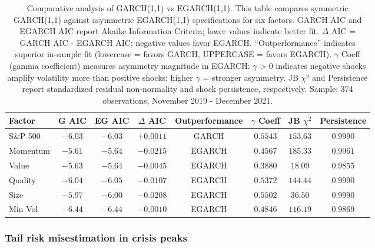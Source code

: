 \documentclass{article}
\begin{document}
\begin{table}[htbp]
\centering
\caption{Comparative analysis of GARCH(1,1) vs EGARCH(1,1). This table compares symmetric GARCH(1,1) against asymmetric EGARCH(1,1) specifications for six factors. GARCH AIC and EGARCH AIC report Akaike Information Criteria; lower values indicate better fit. $\Delta$ AIC = GARCH AIC - EGARCH AIC; negative values favor EGARCH. “Outperformance” indicates superior in-sample fit (lowercase = favors GARCH, UPPERCASE = favors EGARCH). $\gamma$ Coeff (gamma coefficient) measures asymmetry magnitude in EGARCH: $\gamma$ > 0 indicates negative shocks amplify volatility more than positive shocks; higher $\gamma$ = stronger asymmetry. JB $\chi$² and Persistence report standardized residual non-normality and shock persistence, respectively. Sample: 374 observations, November 2019 - December 2021.}
\label{tab:model_comparison}
\begin{tabular}{lccccccc}
\toprule
\textbf{Factor} & \textbf{G AIC} & \textbf{EG AIC} & \textbf{$\Delta$ AIC} & \textbf{Outperformance} & \textbf{$\gamma$ Coeff} & \textbf{JB $\chi^2$} & \textbf{Persistence} \\
\midrule
S\&P 500   & $-6.03$  & $-6.03$  & $+0.0011$  & GARCH  & $0.5543$ & $153.63$ & $0.9990$ \\
Momentum   & $-5.61$  & $-5.64$  & $-0.0215$  & EGARCH & $0.4567$ & $185.33$ & $0.9961$ \\
Value      & $-5.63$  & $-5.64$  & $-0.0045$  & EGARCH & $0.3880$ & $18.09$  & $0.9855$ \\
Quality    & $-6.04$  & $-6.05$  & $-0.0107$  & EGARCH & $\mathbf{0.5372}$ & $144.44$ & $0.9990$ \\
Size       & $-5.97$  & $-6.00$  & $-0.0208$  & EGARCH & $0.5502$ & $36.50$  & $0.9990$ \\
Min Vol    & $-6.44$  & $-6.44$  & $-0.0010$  & EGARCH & $0.4846$ & $116.19$ & $0.9869$ \\
\bottomrule
\end{tabular}
\end{table}



\subsubsection{Tail risk misestimation in crisis peaks}
\end{document}
